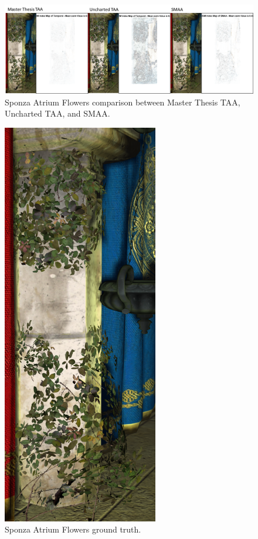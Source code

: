 \documentclass{cslthse-msc}
\begin{document}
\begin{figure}[H]
	\centering
	\includegraphics[scale=0.9]{images/results/sponza_flowers.png}
	\caption{Sponza Atrium Flowers comparison between Master Thesis TAA, Uncharted TAA, and SMAA.}\label{fig:sponza_flowers_render}
\end{figure}

\begin{figure}[H]
	\centering
	\includegraphics[scale=0.2]{images/results/sponza_flowers_sobel_ground_truth.png}
	\caption{Sponza Atrium Flowers ground truth.}\label{fig:sponza_flowers_truth}
\end{figure}
\end{document}
